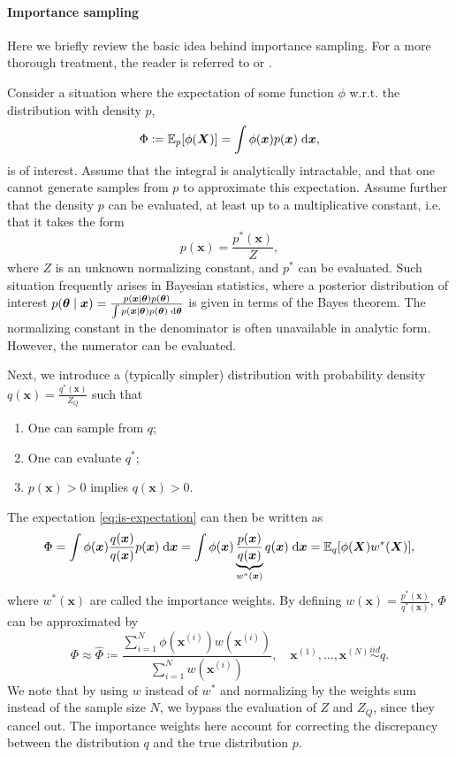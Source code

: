 \paragraph{Importance sampling}
Here we briefly review the basic idea behind importance sampling. For a more thorough treatment, the reader is referred to \cite{information-theory} or \cite{robert-casella}.

Consider a situation where the expectation of some function $\phi$ w.r.t. the distribution with density $p$,
\begin{equation} \label{eq:is-expectation}
\Phi \coloneqq \mathbb{E}_{p}[\phi(\bm{X})] = \int \phi(\bm{x}) p(\bm{x}) \; \mathrm{d}{\bm{x}},
\end{equation}
is of interest. Assume that the integral is analytically intractable, and that one cannot generate samples from $p$ to approximate this expectation. Assume further that the density $p$ can be evaluated, at least up to a multiplicative constant, i.e. that it takes the form
\begin{equation*}
p(\bm{x}) = \frac{p^*(\bm{x})}{Z},
\end{equation*}
where $Z$ is an unknown normalizing constant, and $p^*$ can be evaluated. Such situation frequently arises in Bayesian statistics, where a posterior distribution of interest $p(\bm{\theta} \mid \bm{x}) = \frac{p(\bm{x} \mid \bm{\theta}) p(\bm{\theta})}{\int p(\bm{x} \mid \bm{\theta}) p(\bm{\theta}) \; \mathrm{d}{\bm{\theta}}}$ is given in terms of the Bayes theorem. The normalizing constant in the denominator is often unavailable in analytic form. However, the numerator can be evaluated.

Next, we introduce a (typically simpler) distribution with probability density $q(\bm{x}) = \frac{q^*(\bm{x})}{Z_Q}$ such that
\begin{enumerate}
    \item One can sample from $q$;
    \item One can evaluate $q^*$;
    \item $p(\bm{x}) > 0$ implies $q(\bm{x}) > 0$.
\end{enumerate}
The expectation \eqref{eq:is-expectation} can then be written as
\begin{equation*}
\Phi = \int \phi(\bm{x}) \frac{q(\bm{x})}{q(\bm{x})} p(\bm{x}) \; \mathrm{d}{\bm{x}} = \int \phi(\bm{x}) \underbrace{\frac{p(\bm{x})}{q(\bm{x})}}_{w^*(\bm{x})} q(\bm{x}) \; \mathrm{d}{\bm{x}} = \mathbb{E}_{q}[\phi(\bm{X}) w^*(\bm{X})],
\end{equation*}
where $w^*(\bm{x})$ are called the importance weights. By defining $w(\bm{x}) = \frac{p^*(\bm{x})}{q^*(\bm{x})}$, $\Phi$ can be approximated by
\begin{equation*}
\Phi \approx \widehat{\Phi} \coloneqq \frac{\sum_{i=1}^N \phi(\bm{x}^{(i)}) w(\bm{x}^{(i)})}{\sum_{i=1}^Nw(\bm{x}^{(i)})}, \quad \bm{x}^{(1)}, \ldots, \bm{x}^{(N)} \stackrel{iid}{\sim} q.
\end{equation*}
We note that by using $w$ instead of $w^*$ and normalizing by the weights sum instead of the sample size $N$, we bypass the evaluation of $Z$ and $Z_Q$, since they cancel out. The importance weights here account for correcting the discrepancy between the distribution $q$ and the true distribution $p$.

